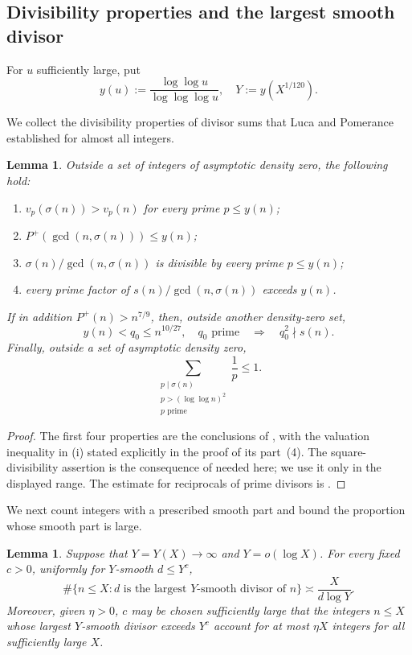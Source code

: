 \documentclass[11pt,letterpaper,reqno]{amsart}
\numberwithin{equation}{section}
\newtheorem{lemma}[theorem]{Lemma}
\theoremstyle{remark}
\renewcommand{\leq}{\leqslant}
\begin{document}
\subsection{Divisibility properties and the largest smooth divisor}

For $u$ sufficiently large, put
\[
 y(u):=\frac{\log\log u}{\log\log\log u},
 \quad Y:=y(X^{1/120}).
\]

We collect the divisibility properties of divisor sums that Luca and Pomerance established for almost all integers.

\begin{lemma}\label{lem:LP-inputs}
Outside a set of integers of asymptotic density
zero, the following hold:
\begin{enumerate}
\item $v_p(\sigma(n))>v_p(n)$ for every prime $p\leq y(n)$;
\item $P^+(\gcd(n,\sigma(n)))\leq y(n)$;
\item $\sigma(n)/\gcd(n,\sigma(n))$ is divisible by every prime
 $p\leq y(n)$;
\item every prime factor of $s(n)/\gcd(n,\sigma(n))$ exceeds $y(n)$.
\end{enumerate}
If in addition $P^+(n)>n^{7/9}$, then, outside another density-zero set,
\[
 y(n)<q_0\leq n^{10/27},\quad q_0\text{ prime}
 \quad\Longrightarrow\quad q_0^2\nmid s(n).
\]
Finally, outside a set of asymptotic density zero,
\[
 \sum_{\substack{p\mid\sigma(n)\\p>(\log\log n)^2\\p\text{ prime}}}\frac1p\leq1.
\]
\end{lemma}

\begin{proof}
The first four properties are the conclusions of
\cite[Lemma~2.1]{LucaPomerance}, with the valuation inequality in \textup{(i)}
stated explicitly in the proof of its part~(4). The square-divisibility
assertion is the consequence of \cite[Lemma~2.2]{LucaPomerance} needed here;
we use it only in the displayed range. The estimate for reciprocals of prime divisors
is \cite[Lemma~2.5]{LucaPomerance}.
\end{proof}

We next count integers with a prescribed smooth part and bound the proportion whose smooth part is large.

\begin{lemma}\label{lem:smooth-part-input}
Suppose that $Y=Y(X)\to\infty$ and $Y=o(\log X)$. For every fixed
$c>0$, uniformly for $Y$-smooth
$d\leq Y^c$,
\[
 \#\{n\leq X:d\text{ is the largest $Y$-smooth divisor of }n\}
 \asymp \frac{X}{d\log Y}.
\]
Moreover, given $\eta>0$, $c$ may be chosen sufficiently large that the
integers $n\leq X$ whose largest $Y$-smooth divisor exceeds $Y^c$ account
for at most $\eta X$ integers for all sufficiently large $X$.
\end{lemma}
\end{document}

